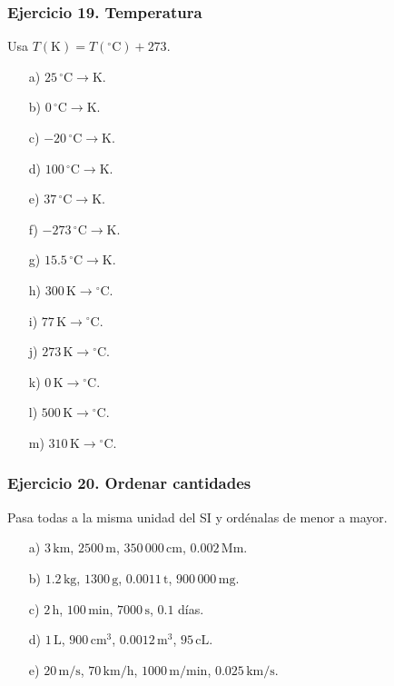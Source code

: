 \subsubsection*{Ejercicio 19. Temperatura}

Usa $T(\mathrm{K})=T({}^\circ\mathrm{C})+273$.

\begin{enumerate}
    \item[a)] $25\,{}^\circ\mathrm{C}\rightarrow\mathrm{K}$.
    \item[b)] $0\,{}^\circ\mathrm{C}\rightarrow\mathrm{K}$.
    \item[c)] $-20\,{}^\circ\mathrm{C}\rightarrow\mathrm{K}$.
    \item[d)] $100\,{}^\circ\mathrm{C}\rightarrow\mathrm{K}$.
    \item[e)] $37\,{}^\circ\mathrm{C}\rightarrow\mathrm{K}$.
    \item[f)] $-273\,{}^\circ\mathrm{C}\rightarrow\mathrm{K}$.
    \item[g)] $15.5\,{}^\circ\mathrm{C}\rightarrow\mathrm{K}$.
    \item[h)] $300\,\mathrm{K}\rightarrow{}^\circ\mathrm{C}$.
    \item[i)] $77\,\mathrm{K}\rightarrow{}^\circ\mathrm{C}$.
    \item[j)] $273\,\mathrm{K}\rightarrow{}^\circ\mathrm{C}$.
    \item[k)] $0\,\mathrm{K}\rightarrow{}^\circ\mathrm{C}$.
    \item[l)] $500\,\mathrm{K}\rightarrow{}^\circ\mathrm{C}$.
    \item[m)] $310\,\mathrm{K}\rightarrow{}^\circ\mathrm{C}$.
\end{enumerate}

\subsubsection*{Ejercicio 20. Ordenar cantidades}

Pasa todas a la misma unidad del SI y ordénalas de menor a mayor.

\begin{enumerate}
    \item[a)] $3\,\mathrm{km}$, $2500\,\mathrm{m}$,
    $350\,000\,\mathrm{cm}$, $0.002\,\mathrm{Mm}$.
    \item[b)] $1.2\,\mathrm{kg}$, $1300\,\mathrm{g}$,
    $0.0011\,\mathrm{t}$, $900\,000\,\mathrm{mg}$.
    \item[c)] $2\,\mathrm{h}$, $100\,\mathrm{min}$,
    $7000\,\mathrm{s}$, $0.1$ días.
    \item[d)] $1\,\mathrm{L}$, $900\,\mathrm{cm^3}$,
    $0.0012\,\mathrm{m^3}$, $95\,\mathrm{cL}$.
    \item[e)] $20\,\mathrm{m/s}$, $70\,\mathrm{km/h}$,
    $1000\,\mathrm{m/min}$, $0.025\,\mathrm{km/s}$.
\end{enumerate}

